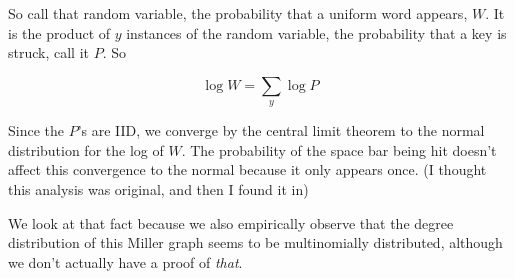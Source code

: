 \documentclass[12pt]{article}
\begin{document}
So call that random variable, the probability that a uniform word appears, $W$. It is the product of $y$ instances of the random variable, the probability that a key is struck, call it $P$. So

$$ \log W = \sum_y \log P $$

Since the $P$'s are IID, we converge by the central limit theorem to the normal distribution for the log of $W$. The probability of the space bar being hit doesn't affect this convergence to the normal because it only appears once. (I thought this analysis was original, and then I found it in) %

We look at that fact because we also empirically observe that the degree distribution of this Miller graph seems to be multinomially distributed, although we don't actually have a proof of \emph{that}.


\end{document}
